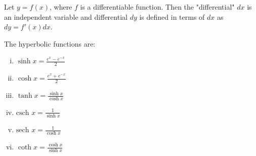 \documentclass[a4paper,8pt]{article}
\begin{document}
\begin{outline}
    Let \(y = f(x)\), where \(f\) is a differentiable function. Then the "differential" \(dx\) is an independent
    variable and differential \(dy\) is defined in terms of \(dx\) as \(dy = f'(x)dx\).

    The hyperbolic functions are:
    \begin{enumerate}[i.]
      \item \(\sinh{x} = \frac{e^x - e^{-x}}{2}\)
      \item \(\cosh{x} = \frac{e^x+e^{-x}}{2}\)
      \item \(\tanh{x} = \frac{\sinh{x}}{\cosh{x}}\)
      \item \(\text{csch }x = \frac{1}{\sinh{x}}\)
      \item \(\text{sech }x = \frac{1}{\cosh{x}}\)
      \item \(\coth{x} = \frac{\cosh{x}}{\sinh{x}}\)
    \end{enumerate}

\end{outline}
\end{document}
